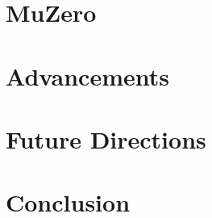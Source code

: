 \documentclass[conference]{IEEEtran}
\begin{document}
\section{MuZero}


\section{Advancements}


\section{Future Directions}


\section*{Conclusion}

\end{document}
